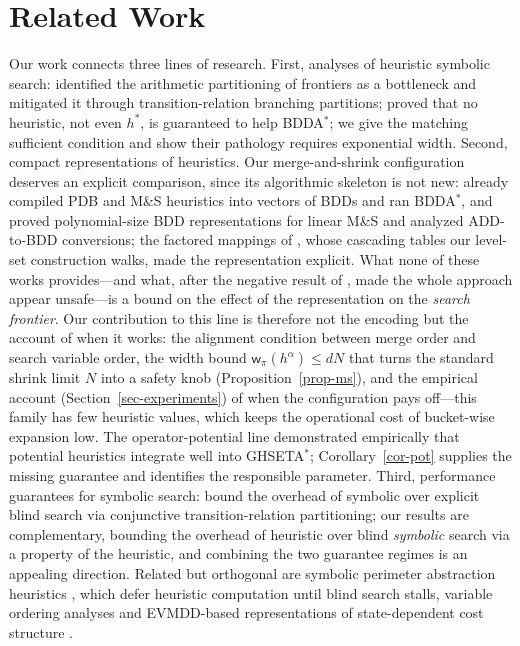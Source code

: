\documentclass[letterpaper]{article}
\newcommand{\hstar}{\ensuremath{h^{*}}}
\newcommand{\width}{\ensuremath{\mathsf{w}}}
\newcommand{\bddastar}{BDDA\ensuremath{^{*}}}
\newcommand{\ghseta}{GHSETA\ensuremath{^{*}}}
\theoremstyle{plain}
\theoremstyle{definition}
\theoremstyle{remark}
\begin{document}
\section{Related Work}

Our work connects three lines of research. First, analyses of heuristic
symbolic search: \citet{jensen-et-al-aij2008} identified the arithmetic
partitioning of frontiers as a bottleneck and mitigated it through
transition-relation branching partitions;
\citet{speck-et-al-icaps2020} proved that no heuristic, not even
\hstar, is guaranteed to help \bddastar; we give the matching sufficient
condition and show their pathology requires exponential width. Second,
compact representations of heuristics.
Our merge-and-shrink configuration deserves an explicit comparison,
since its algorithmic skeleton is not new:
\citet{edelkamp-et-al-ecai2012} already compiled PDB and M\&S heuristics
into vectors of BDDs and ran \bddastar, and \citet{torralba-phd2015}
proved polynomial-size BDD representations for linear M\&S and analyzed
ADD-to-BDD conversions; the factored mappings of
\citet{helmert-et-al-icaps2015}, whose cascading tables our level-set
construction walks, made the representation explicit. What none of these
works provides---and what, after the negative result of
\citet{speck-et-al-icaps2020}, made the whole approach appear unsafe---is
a bound on the effect of the representation on the \emph{search
frontier}. Our contribution to this line is therefore not the encoding
but the account of when it works: the alignment condition between merge
order and search variable order, the width bound
$\width_\pi(h^\alpha) \leq dN$ that turns the standard shrink limit $N$
into a safety knob (Proposition~\ref{prop-ms}), and the empirical
account (Section~\ref{sec-experiments}) of when the configuration pays
off---this family has few heuristic values, which keeps the operational
cost of bucket-wise expansion low. The
operator-potential line
\citep{fiser-et-al-aaai2022,fiser-et-al-aij2024} demonstrated
empirically that potential heuristics integrate well into \ghseta;
Corollary~\ref{cor-pot} supplies the missing guarantee and identifies
the responsible parameter. Third, performance guarantees for symbolic
search: \citet{speck-helmert-ecai2025} bound the overhead of symbolic
over explicit blind search via conjunctive transition-relation
partitioning; our results are complementary, bounding the overhead of
heuristic over blind \emph{symbolic} search via a property of the
heuristic, and combining the two guarantee regimes is an appealing
direction. Related but orthogonal are symbolic perimeter abstraction
heuristics \citep{torralba-et-al-ijcai2016a,torralba-et-al-aij2018},
which defer heuristic computation until blind search stalls, variable
ordering analyses
\citep{kissmann-hoffmann-jair2014} and EVMDD-based representations of
state-dependent cost structure \citep{speck-et-al-icaps2018}.
\end{document}
